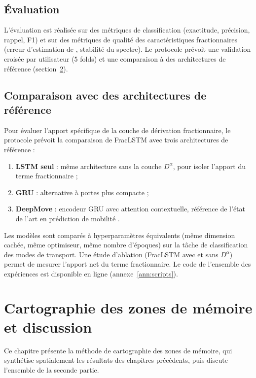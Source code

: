 \section{Évaluation}
\label{sec:evaluation}
L'évaluation est réalisée sur des métriques de classification (exactitude, précision, rappel, F1) et sur des métriques de qualité des caractéristiques fractionnaires (erreur d'estimation de \Hurst, stabilité du spectre). Le protocole prévoit une validation croisée par utilisateur (5 folds) et une comparaison à des architectures de référence (section~\ref{sec:comparaison}).

\section{Comparaison avec des architectures de référence}
\label{sec:comparaison}
Pour évaluer l'apport spécifique de la couche de dérivation fractionnaire, le protocole prévoit la comparaison de FracLSTM avec trois architectures de référence :
\begin{enumerate}
\item \textbf{LSTM seul} : même architecture sans la couche $D^\alpha$, pour isoler l'apport du terme fractionnaire ;
\item \textbf{GRU} : alternative à portes plus compacte ;
\item \textbf{DeepMove} \cite{feng2018} : encodeur GRU avec attention contextuelle, référence de l'état de l'art en prédiction de mobilité \cite{luca2022,chen2024}.
\end{enumerate}
Les modèles sont comparés à hyperparamètres équivalents (même dimension cachée, même optimiseur, même nombre d'époques) sur la tâche de classification des modes de transport. Une étude d'ablation (FracLSTM avec et sans $D^\alpha$) permet de mesurer l'apport net du terme fractionnaire. Le code de l'ensemble des expériences est disponible en ligne (annexe~\ref{ann:scripts}).

\chapter{Cartographie des zones de mémoire et discussion}
\label{chap:cartographie}

Ce chapitre présente la méthode de cartographie des zones de mémoire, qui synthétise spatialement les résultats des chapitres précédents, puis discute l'ensemble de la seconde partie.

